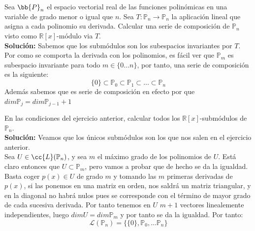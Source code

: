 \begin{ejercicio}
    Sea $\bb{P}_n$ el espacio vectorial real de las funciones polinómicas en una variable de grado menor o igual que $n$. Sea $T:\mathbb{P}_n \to \mathbb{P}_n$ la aplicación lineal que asigna a cada polinomio su derivada. Calcular una serie de composición de $\mathbb{P}_n $ visto como $\mathbb{R}[x]$-módulo via $T$. \\
    
    \noindent
    \textbf{Solución:}
    Sabemos que los submódulos son los subespacios invariantes por $T$. Por como se comporta la derivada con los polinomios, es fácil ver que $\mathbb{P}_m $ es subespacio invariante para todo $m \in \{0\ldots n\}$, por tanto, una serie de composición es la siguiente:
    \begin{equation*}
        \{0\} \subset \mathbb{P}_0 \subset \mathbb{P}_1 \subset \ldots \subset \mathbb{P}_n 
    \end{equation*}
    Además sabemos que es serie de composición en efecto por que $dim \mathbb{P}_j = dim \mathbb{P}_{j-1} + 1$ 
\end{ejercicio}

\begin{ejerciciostarstar}
    En las condiciones del ejercicio anterior, calcular todos los $\mathbb{R}[x]$-submódulos de $\mathbb{P}_n $. \\
    
    \noindent
    \textbf{Solución:}
    Veamos que los únicos submódulos son los que nos salen en el ejercicio anterior. \\

    \noindent
    Sea $U\in \cc{L}(\mathbb{P}_n )$, y sea $m$ el máximo grado de los polinomios de $U$. Está claro entonces que $U \subset \mathbb{P}_m$, pero vamos a probar que de hecho se da la igualdad. Basta coger $p(x) \in U$ de grado $m$ y tomando las $m$ primeras derivadas de $p(x)$, si las ponemos en una matriz en orden, nos saldrá un matriz triangular, y en la diagonal no habrá nulos pues se corresponde con el término de mayor grado de cada sucesiva derivada. Por tanto tenemos en $U$ $m+1$ vectores linealemente independientes, luego $dim U = dim \mathbb{P}_m$ y por tanto se da la igualdad. Por tanto:
    \begin{equation*}
        \mathcal{L}(\mathbb{P}_n ) = \{\{0\}, \mathbb{P}_0, \ldots \mathbb{P}_n \}
    \end{equation*}
\end{ejerciciostarstar}

